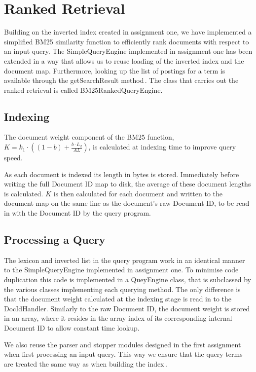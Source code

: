 
\section{Ranked Retrieval}
\label{sec:rankedRetrieval}
Building on the inverted index created in assignment one, we have implemented a simplified BM25 similarity function to efficiently rank documents with respect to an input query. The SimpleQueryEngine implemented in assignment one has been extended in a way that allows us to reuse loading of the inverted index and the document map. Furthermore, looking up the list of postings for a term is available through the getSearchResult method\,\cite{dahlsmith13}. The class that carries out the ranked retrieval is called BM25RankedQueryEngine.

\subsection*{Indexing}
The document weight component of the BM25 function, \(K = k_1 \cdot \left( \left(1 - b\right) + \frac{b \cdot L_d}{AL}\right)\), is calculated at indexing time to improve query speed.

As each document is indexed its length in bytes is stored. Immediately before writing the full Document ID map to disk, the average of these document lengths is calculated. \(K\) is then calculated for each document and written to the document map on the same line as the document's raw Document ID, to be read in with the Document ID by the query program.

\subsection*{Processing a Query}
The lexicon and inverted list in the query program work in an identical manner to the SimpleQueryEngine implemented in assignment one. To minimise code duplication this code is implemented in a QueyEngine class, that is subclassed by the various classes implementing each querying method. The only difference is that the document weight calculated at the indexing stage is read in to the DocIdHandler. Similarly to the raw Document ID, the document weight is stored in an array, where it resides in the array index of its corresponding internal Document ID to allow constant time lookup.

We also reuse the parser and stopper modules designed in the first assignment when first processing an input query. This way we ensure that the query terms are treated the same way as when building the index\,\cite{dahlsmith13}.

